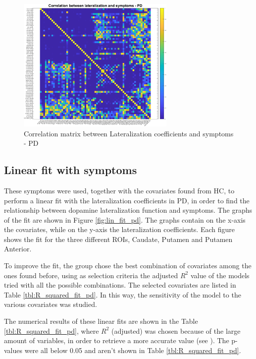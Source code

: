 \documentclass[]{article}
\begin{document}
\begin{figure}[h]
	\centering
	\includegraphics[width=3in]{../corr_mat_symptoms_pd}
	\caption{Correlation matrix between Lateralization coefficients and symptoms - PD}
	\label{fig:corr_symp_pd}
\end{figure} 

\begin{multicols}{2}

\subsection{Linear fit with symptoms}

These symptoms were used, together with the covariates found from HC, to perform a linear fit with the lateralization coefficients in PD, in order to find the relationship between dopamine lateralization function and symptoms. The graphs of the fit are shown in Figure \ref{fig:lin_fit_pd}. The graphs contain on the x-axis the covariates, while on the y-axis the lateralization coefficients. Each figure shows the fit for the three different ROIs, Caudate, Putamen and Putamen Anterior. 

To improve the fit, the group chose the best combination of covariates among the ones found before, using as selection criteria the adjusted $R^2$ value of the models tried with all the possible combinations. The selected covariates are listed in Table \ref{tbl:R_squared_fit_pd}. 
In this way, the sensitivity of the model to the various covariates was studied.

The numerical results of these linear fits are shown in the Table \ref{tbl:R_squared_fit_pd}, where $R^2$ (adjusted) was chosen because of the large amount of variables, in order to retrieve a more accurate value (see \cite{analysis_of_covariance_and_alternatives}). The p-values were all below 0.05 and aren't shown in Table \ref{tbl:R_squared_fit_pd}.

\end{multicols}
\end{document}
